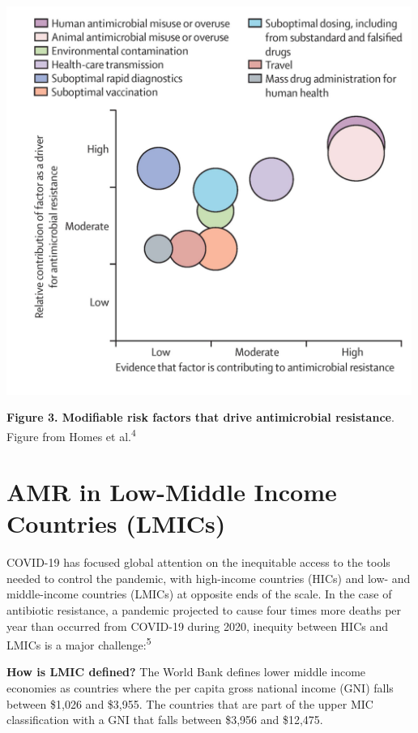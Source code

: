 \documentclass[
]{book}
\begin{document}
\includegraphics[width=5.20833in,height=\textheight]{images/modifiablerisk.png}

\textbf{Figure 3. Modifiable risk factors that drive antimicrobial resistance}. Figure from Homes et al.\textsuperscript{4}

\hypertarget{amr-in-low-middle-income-countries-lmics}{%
\section*{AMR in Low-Middle Income Countries (LMICs)}\label{amr-in-low-middle-income-countries-lmics}}

COVID-19 has focused global attention on the inequitable access to the tools needed to control the pandemic, with high-income countries (HICs) and low- and middle-income countries (LMICs) at opposite ends of the scale. In the case of antibiotic resistance, a pandemic projected to cause four times more deaths per year than occurred from COVID-19 during 2020, inequity between HICs and LMICs is a major challenge:\textsuperscript{5}

\textbf{How is LMIC defined?} The World Bank defines lower middle income economies as countries where the per capita gross national income (GNI) falls between \$1,026 and \$3,955. The countries that are part of the upper MIC classification with a GNI that falls between \$3,956 and \$12,475.
\end{document}
